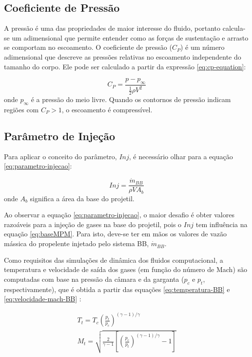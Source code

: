 \subsection{Coeficiente de Pressão}

A pressão é uma das propriedades de maior interesse do fluido, portanto calcula-se um adimensional que permite entender como as forças de sustentação e arrasto se comportam no escoamento. O coeficiente de pressão ($C_{P}$) é um número adimensional que descreve as pressões relativas no escoamento independente do tamanho do corpo. Ele pode ser calculado a partir da expressão \eqref{eq:cp-equation}: 

\begin{equation}\label{eq:cp-equation}
    C_P = \frac{p - p_{\infty}}{\frac{1}{2}\rho V^2}
\end{equation}
%
onde $p_{\infty}$ é a pressão do meio livre. Quando os contornos de pressão indicam regiões com $C_{P} > 1$, o escoamento é compressível.

\subsection{Parâmetro de Injeção}

Para aplicar o conceito do parâmetro, $Inj$, é necessário olhar para a equação \ref{eq:parametro-injecao}:

\begin{equation}\label{eq:parametro-injecao}
    Inj = \frac{\Dot{m}_{BB}}{\rho VA_{b}}
\end{equation}
%
onde $A_{b}$ significa a área da base do projetil. 

Ao observar a equação \ref{eq:parametro-injecao}, o maior desafio é obter valores razoáveis para a injeção de gases na base do projetil, pois o $Inj$ tem influência na equação \ref{eq:baseMPM}. Para isto, deve-se ter em mãos os valores de vazão mássica do propelente injetado pelo sistema BB, $\Dot{m}_{BB}$. 

Como requisitos das simulações de dinâmica dos fluidos computacional, a temperatura e velocidade de saída dos gases (em função do número de Mach) são computadas com base na pressão da câmara e da garganta (\(p_{c}\) e \(p_{t}\), respectivamente), que é obtida a partir das equações \ref{eq:temperatura-BB} e \ref{eq:velocidade-mach-BB} \cite{Gil2020}:

\begin{align}
    \label{eq:temperatura-BB}
    T_{t} = T_{c}\left(\frac{p_t}{p_c}\right)^{(\gamma - 1)/\gamma} \\
    \label{eq:velocidade-mach-BB}
    M_{t} = \sqrt{\frac{2}{\gamma - 1}\left[\left(\frac{p_c}{p_t}\right)^{(\gamma - 1)/\gamma}-1\right]}
\end{align}

